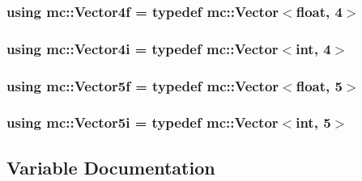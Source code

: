 \subsubsection[{\texorpdfstring{Vector4f}{Vector4f}}]{\setlength{\rightskip}{0pt plus 5cm}using {\bf mc\+::\+Vector4f} = typedef {\bf mc\+::\+Vector}$<$float, 4$>$}\hypertarget{namespacemc_a4707e2534bbb331543497a85a755bc1c}{}\label{namespacemc_a4707e2534bbb331543497a85a755bc1c}
\subsubsection[{\texorpdfstring{Vector4i}{Vector4i}}]{\setlength{\rightskip}{0pt plus 5cm}using {\bf mc\+::\+Vector4i} = typedef {\bf mc\+::\+Vector}$<$int, 4$>$}\hypertarget{namespacemc_a2886018be91992764bd5cf4e57f56cd8}{}\label{namespacemc_a2886018be91992764bd5cf4e57f56cd8}
\subsubsection[{\texorpdfstring{Vector5f}{Vector5f}}]{\setlength{\rightskip}{0pt plus 5cm}using {\bf mc\+::\+Vector5f} = typedef {\bf mc\+::\+Vector}$<$float, 5$>$}\hypertarget{namespacemc_adf31bc87669908e0eb5e5c10506f4d85}{}\label{namespacemc_adf31bc87669908e0eb5e5c10506f4d85}
\subsubsection[{\texorpdfstring{Vector5i}{Vector5i}}]{\setlength{\rightskip}{0pt plus 5cm}using {\bf mc\+::\+Vector5i} = typedef {\bf mc\+::\+Vector}$<$int, 5$>$}\hypertarget{namespacemc_a7ed5c5e05ed6579a2bd14ad0e00fc8d8}{}\label{namespacemc_a7ed5c5e05ed6579a2bd14ad0e00fc8d8}


\subsection{Variable Documentation}
